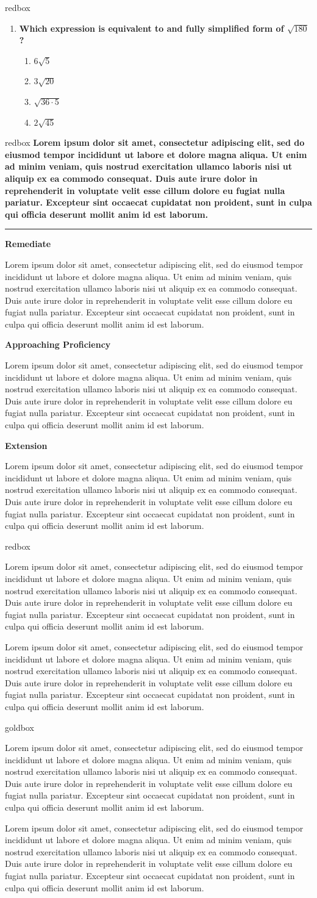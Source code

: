 \documentclass[10pt]{article}
\newcommand{\LoremIpsum}{
    Lorem ipsum dolor sit amet, consectetur adipiscing elit, sed do eiusmod
    tempor incididunt ut labore et dolore magna aliqua. Ut enim ad minim
    veniam, quis nostrud exercitation ullamco laboris nisi ut aliquip ex ea
    commodo consequat. Duis aute irure dolor in reprehenderit in voluptate
    velit esse cillum dolore eu fugiat nulla pariatur. Excepteur sint
    occaecat cupidatat non proident, sunt in culpa qui officia deserunt
    mollit anim id est laborum.
}
\begin{document}
\begin{skillbox}{redbox}
\begin{multicols}{2}
\begin{enumerate}
                \item \textbf{Which expression is equivalent to and
                fully simplified form of $ \sqrt{180} $ ?}
                \begin{enumerate}[label=\Alph*.]
                    \item $ 6\sqrt{5} $
                    \item $ 3\sqrt{20} $
                    \item $ \sqrt{36\cdot 5} $
                    \item $ 2 \sqrt{45} $
                \end{enumerate}
            \end{enumerate}
        \end{multicols}
    \end{skillbox}

    \renewcommand{\arraystretch}{1.6}
    \begin{skillbox}{redbox}
        \textbf{\LoremIpsum}
        \par\medskip
        \hrule
        \medskip

        \begin{multicols}{3}
            \raggedcolumns
            \setlength{\columnsep}{1cm}
            \setlength{\columnseprule}{0.2pt}

            \textbf{Remediate}
            \LoremIpsum
            \columnbreak

            \textbf{Approaching Proficiency}
            \LoremIpsum
            \columnbreak

            \textbf{Extension}
            \LoremIpsum
        \end{multicols}
    \end{skillbox}

    \renewcommand{\arraystretch}{1.6}
    \begin{skillbox}{redbox}
        \begin{minipage}[t]{0.48\linewidth}
            \LoremIpsum
        \end{minipage}
        \hfill
        \begin{minipage}[t]{0.48\linewidth}
            \LoremIpsum
        \end{minipage}
    \end{skillbox}

    \renewcommand{\arraystretch}{1.6}
    \begin{skillbox}{goldbox}
        \begin{minipage}[t]{0.48\linewidth}
            \LoremIpsum
        \end{minipage}
        \hfill
        \begin{minipage}[t]{0.48\linewidth}
            \LoremIpsum
        \end{minipage}
    \end{skillbox}

    
    
\end{document}
